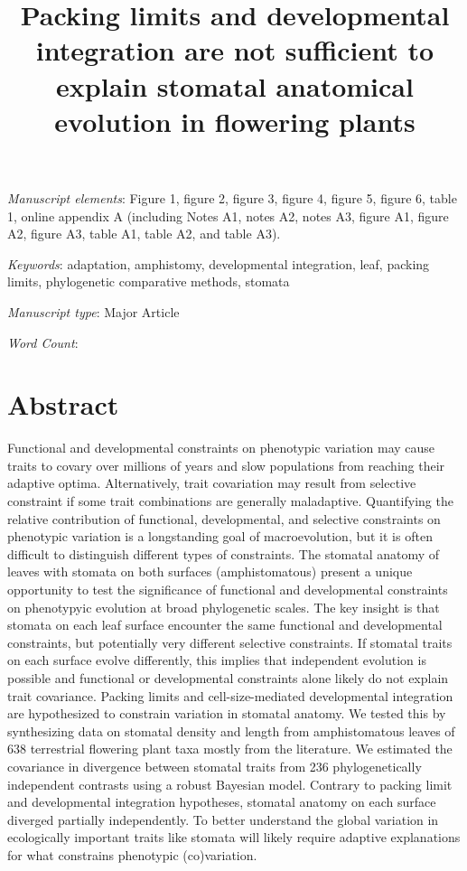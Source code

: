 \documentclass[
  12pt,
]{article}
\title{Packing limits and developmental integration are not sufficient to explain stomatal anatomical evolution in flowering plants}
\author{}
\date{\vspace{-2.5em}}
\author{}
\date{}
\begin{document}
\maketitle

\bigskip

\textit{Manuscript elements}: Figure 1, figure 2, figure 3, figure 4, figure 5, figure 6, table 1, online appendix A (including Notes A1, notes A2, notes A3, figure A1, figure A2, figure A3, table A1, table A2, and table A3).

\bigskip

\textit{Keywords}: adaptation, amphistomy, developmental integration, leaf, packing limits, phylogenetic comparative methods, stomata

\bigskip

\textit{Manuscript type}: Major Article

\bigskip

\textit{Word Count}:

\bigskip

\linenumbers{}
\modulolinenumbers[3]

\newpage{}

\hypertarget{abstract}{%
\section{Abstract}\label{abstract}}

Functional and developmental constraints on phenotypic variation may cause traits to covary over millions of years and slow populations from reaching their adaptive optima. Alternatively, trait covariation may result from selective constraint if some trait combinations are generally maladaptive. Quantifying the relative contribution of functional, developmental, and selective constraints on phenotypic variation is a longstanding goal of macroevolution, but it is often difficult to distinguish different types of constraints. The stomatal anatomy of leaves with stomata on both surfaces (amphistomatous) present a unique opportunity to test the significance of functional and developmental constraints on phenotypyic evolution at broad phylogenetic scales. The key insight is that stomata on each leaf surface encounter the same functional and developmental constraints, but potentially very different selective constraints. If stomatal traits on each surface evolve differently, this implies that independent evolution is possible and functional or developmental constraints alone likely do not explain trait covariance. Packing limits and cell-size-mediated developmental integration are hypothesized to constrain variation in stomatal anatomy. We tested this by synthesizing data on stomatal density and length from amphistomatous leaves of 638 terrestrial flowering plant taxa mostly from the literature. We estimated the covariance in divergence between stomatal traits from 236 phylogenetically independent contrasts using a robust Bayesian model. Contrary to packing limit and developmental integration hypotheses, stomatal anatomy on each surface diverged partially independently. To better understand the global variation in ecologically important traits like stomata will likely require adaptive explanations for what constrains phenotypic (co)variation.
\end{document}
